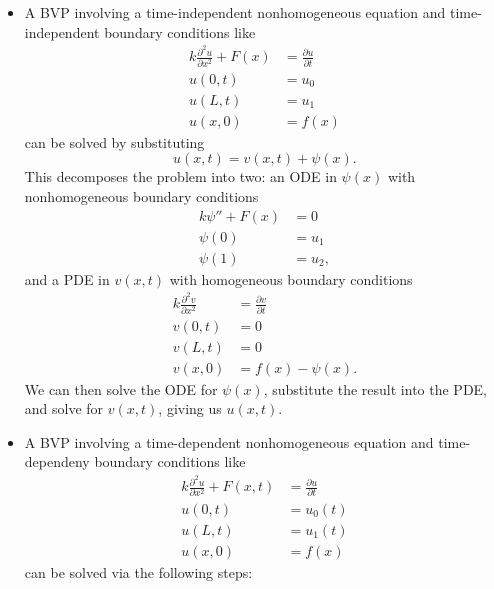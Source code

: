 \documentclass{article}
\begin{document}
\begin{itemize}
  \item A BVP involving a time-independent nonhomogeneous equation and time-independent boundary conditions like \begin{align*}
          k \frac{\partial^2 u}{\partial x^2} + F(x) & = \frac{\partial u}{\partial t} \\
          u(0, t)                                    & = u_0                           \\
          u(L, t)                                    & = u_1                           \\
          u(x, 0)                                    & = f(x)
        \end{align*} can be solved by substituting \[u(x, t) = v(x, t) + \psi(x).\] This decomposes the problem into two: an ODE in $\psi(x)$ with nonhomogeneous boundary conditions \begin{align*}
          k \psi'' + F(x) & = 0    \\
          \psi(0)         & = u_1  \\
          \psi(1)         & = u_2,
        \end{align*} and a PDE in $v(x, t)$ with homogeneous boundary conditions \begin{align*}
          k \frac{\partial^2 v}{\partial x^2} & = \frac{\partial v}{\partial t} \\
          v(0, t)                             & = 0                             \\
          v(L, t)                             & = 0                             \\
          v(x, 0)                             & = f(x) - \psi(x).
        \end{align*} We can then solve the ODE for $\psi(x)$, substitute the result into the PDE, and solve for $v(x, t)$, giving us $u(x, t)$.

  \item A BVP involving a time-dependent nonhomogeneous equation and time-dependeny boundary conditions like \begin{align*}
          k \frac{\partial^2 u}{\partial x^2} + F(x, t) & = \frac{\partial u}{\partial t} \\
          u(0, t)                                       & = u_0(t)                        \\
          u(L, t)                                       & = u_1(t)                        \\
          u(x, 0)                                       & = f(x)
        \end{align*} can be solved via the following steps:


\end{itemize}
\end{document}
